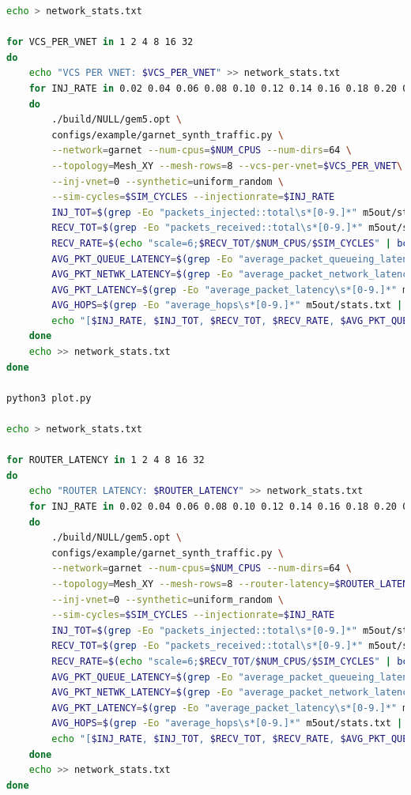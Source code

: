 \documentclass{article}
\begin{document}
\begin{lstlisting}[language=bash]
echo > network_stats.txt

for VCS_PER_VNET in 1 2 4 8 16 32
do
	echo "VCS PER VNET: $VCS_PER_VNET" >> network_stats.txt
	for INJ_RATE in 0.02 0.04 0.06 0.08 0.10 0.12 0.14 0.16 0.18 0.20 0.22 0.24 0.26 0.28 0.30 0.32 0.34 0.36 0.38 0.40 0.42 0.44 0.46 0.48 0.50 0.52 0.54 0.56 0.58 0.60 0.62 0.64 0.66 0.68 0.70 0.72 0.74 0.76 0.78 0.80
	do
		./build/NULL/gem5.opt \
		configs/example/garnet_synth_traffic.py \
		--network=garnet --num-cpus=$NUM_CPUS --num-dirs=64 \
		--topology=Mesh_XY --mesh-rows=8 --vcs-per-vnet=$VCS_PER_VNET\
		--inj-vnet=0 --synthetic=uniform_random \
		--sim-cycles=$SIM_CYCLES --injectionrate=$INJ_RATE
		INJ_TOT=$(grep -Eo "packets_injected::total\s*[0-9.]*" m5out/stats.txt | grep -Eo "[0-9.]*")
		RECV_TOT=$(grep -Eo "packets_received::total\s*[0-9.]*" m5out/stats.txt | grep -Eo "[0-9.]*")
		RECV_RATE=$(echo "scale=6;$RECV_TOT/$NUM_CPUS/$SIM_CYCLES" | bc)
		AVG_PKT_QUEUE_LATENCY=$(grep -Eo "average_packet_queueing_latency\s*[0-9.]*" m5out/stats.txt | grep -Eo "[0-9.]*")
		AVG_PKT_NETWK_LATENCY=$(grep -Eo "average_packet_network_latency\s*[0-9.]*" m5out/stats.txt | grep -Eo "[0-9.]*")
		AVG_PKT_LATENCY=$(grep -Eo "average_packet_latency\s*[0-9.]*" m5out/stats.txt | grep -Eo "[0-9.]*")
		AVG_HOPS=$(grep -Eo "average_hops\s*[0-9.]*" m5out/stats.txt | grep -Eo "[0-9.]*")
		echo "[$INJ_RATE, $INJ_TOT, $RECV_TOT, $RECV_RATE, $AVG_PKT_QUEUE_LATENCY, $AVG_PKT_NETWK_LATENCY, $AVG_PKT_LATENCY, $AVG_HOPS]" >> network_stats.txt
	done
	echo >> network_stats.txt
done

python3 plot.py

echo > network_stats.txt

for ROUTER_LATENCY in 1 2 4 8 16 32
do
	echo "ROUTER LATENCY: $ROUTER_LATENCY" >> network_stats.txt
	for INJ_RATE in 0.02 0.04 0.06 0.08 0.10 0.12 0.14 0.16 0.18 0.20 0.22 0.24 0.26 0.28 0.30 0.32 0.34 0.36 0.38 0.40 0.42 0.44 0.46 0.48 0.50 0.52 0.54 0.56 0.58 0.60 0.62 0.64 0.66 0.68 0.70 0.72 0.74 0.76 0.78 0.80
	do
		./build/NULL/gem5.opt \
		configs/example/garnet_synth_traffic.py \
		--network=garnet --num-cpus=$NUM_CPUS --num-dirs=64 \
		--topology=Mesh_XY --mesh-rows=8 --router-latency=$ROUTER_LATENCY\
		--inj-vnet=0 --synthetic=uniform_random \
		--sim-cycles=$SIM_CYCLES --injectionrate=$INJ_RATE
		INJ_TOT=$(grep -Eo "packets_injected::total\s*[0-9.]*" m5out/stats.txt | grep -Eo "[0-9.]*")
		RECV_TOT=$(grep -Eo "packets_received::total\s*[0-9.]*" m5out/stats.txt | grep -Eo "[0-9.]*")
		RECV_RATE=$(echo "scale=6;$RECV_TOT/$NUM_CPUS/$SIM_CYCLES" | bc)
		AVG_PKT_QUEUE_LATENCY=$(grep -Eo "average_packet_queueing_latency\s*[0-9.]*" m5out/stats.txt | grep -Eo "[0-9.]*")
		AVG_PKT_NETWK_LATENCY=$(grep -Eo "average_packet_network_latency\s*[0-9.]*" m5out/stats.txt | grep -Eo "[0-9.]*")
		AVG_PKT_LATENCY=$(grep -Eo "average_packet_latency\s*[0-9.]*" m5out/stats.txt | grep -Eo "[0-9.]*")
		AVG_HOPS=$(grep -Eo "average_hops\s*[0-9.]*" m5out/stats.txt | grep -Eo "[0-9.]*")
		echo "[$INJ_RATE, $INJ_TOT, $RECV_TOT, $RECV_RATE, $AVG_PKT_QUEUE_LATENCY, $AVG_PKT_NETWK_LATENCY, $AVG_PKT_LATENCY, $AVG_HOPS]" >> network_stats.txt
	done
	echo >> network_stats.txt
done


\end{lstlisting}
\end{document}
